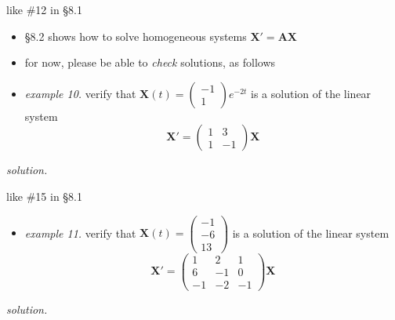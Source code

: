 \documentclass[urlcolor=blue,dvipsnames]{beamer}
\newcommand{\bA}{\mathbf{A}}
\newcommand{\bX}{\mathbf{X}}
\begin{document}
\begin{frame}{like \#12 in \S8.1}

\begin{itemize}
\item \S8.2 shows how to solve homogeneous systems $\bX' = \bA \bX$
\item for now, please be able to \emph{check} solutions, as follows
\item \emph{example 10.}  verify that $\displaystyle \bX(t)=\begin{pmatrix} -1 \\ 1 \end{pmatrix} e^{-2t}$ is a solution of the linear system
    $$\bX' = \begin{pmatrix} 1 & 3 \\ 1 & -1 \end{pmatrix} \bX$$
\end{itemize}

\noindent \emph{solution.}

\vspace{35mm}
\end{frame}


\begin{frame}{like \#15 in \S8.1}

\begin{itemize}
\item \emph{example 11.}  verify that $\displaystyle \bX(t)=\begin{pmatrix} -1 \\ -6 \\ 13 \end{pmatrix}$ is a solution of the linear system
    $$\bX' = \begin{pmatrix} 1 & 2 & 1 \\ 6 & -1 & 0 \\ -1 & -2 & -1 \end{pmatrix} \bX$$
\end{itemize}

\noindent \emph{solution.}

\vspace{35mm}
\end{frame}
\end{document}
